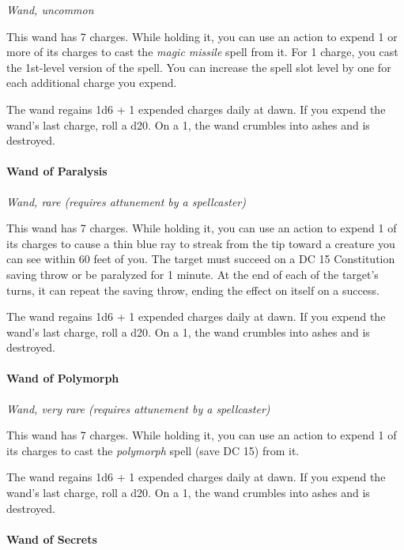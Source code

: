 \documentclass[
]{article}
\begin{document}
\emph{Wand, uncommon}

This wand has 7 charges. While holding it, you can use an action to
expend 1 or more of its charges to cast the \emph{magic missile} spell
from it. For 1 charge, you cast the 1st-level version of the spell. You
can increase the spell slot level by one for each additional charge you
expend.

The wand regains 1d6 + 1 expended charges daily at dawn. If you expend
the wand's last charge, roll a d20. On a 1, the wand crumbles into ashes
and is destroyed.

\hypertarget{wand-of-paralysis}{%
\paragraph{Wand of Paralysis}\label{wand-of-paralysis}}

\emph{Wand, rare (requires attunement by a spellcaster)}

This wand has 7 charges. While holding it, you can use an action to
expend 1 of its charges to cause a thin blue ray to streak from the tip
toward a creature you can see within 60 feet of you. The target must
succeed on a DC 15 Constitution saving throw or be paralyzed for 1
minute. At the end of each of the target's turns, it can repeat the
saving throw, ending the effect on itself on a success.

The wand regains 1d6 + 1 expended charges daily at dawn. If you expend
the wand's last charge, roll a d20. On a 1, the wand crumbles into ashes
and is destroyed.

\hypertarget{wand-of-polymorph}{%
\paragraph{Wand of Polymorph}\label{wand-of-polymorph}}

\emph{Wand, very rare (requires attunement by a spellcaster)}

This wand has 7 charges. While holding it, you can use an action to
expend 1 of its charges to cast the \emph{polymorph} spell (save DC 15)
from it.

The wand regains 1d6 + 1 expended charges daily at dawn. If you expend
the wand's last charge, roll a d20. On a 1, the wand crumbles into ashes
and is destroyed.

\hypertarget{wand-of-secrets}{%
\paragraph{Wand of Secrets}\label{wand-of-secrets}}
\end{document}
